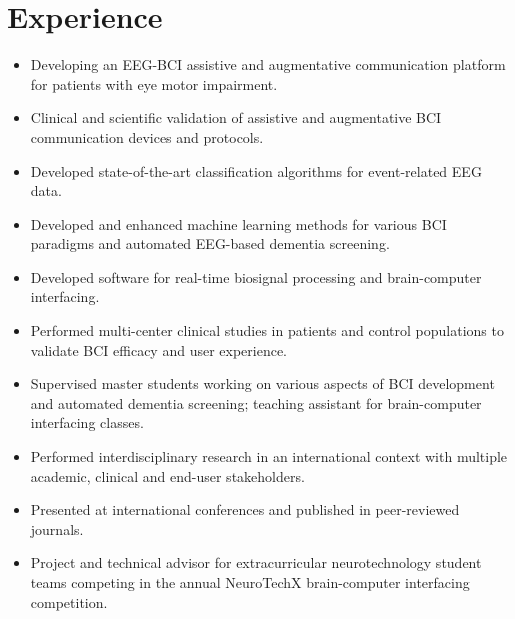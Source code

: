 \documentclass{resume}
\begin{document}
\section{Experience}
\begin{itemize}
	\item Developing an EEG-BCI assistive and augmentative
	communication platform for patients with eye motor impairment.
	\item Clinical and scientific validation of assistive and
	augmentative BCI communication devices and protocols.
\end{itemize}
\begin{itemize}
 \item Developed state-of-the-art classification algorithms for event-related
 EEG data.
 \item Developed and enhanced machine learning methods for various BCI
 paradigms and automated EEG-based dementia screening.
 \item Developed software for real-time biosignal processing and
 brain-computer interfacing.
 \item Performed multi-center clinical studies in patients and control
 populations to validate BCI efficacy and user experience.
 \item Supervised master students working on various aspects of BCI development
 and automated dementia screening; teaching assistant for brain-computer
 interfacing classes.
 \item Performed interdisciplinary research in an international context with
 multiple academic, clinical and end-user stakeholders.
 \item Presented at international conferences and published in peer-reviewed
   journals.
\end{itemize}
\begin{itemize}
	\item Project and technical advisor for extracurricular neurotechnology
	student teams competing in the annual NeuroTechX brain-computer
	interfacing competition.
\end{itemize}
\smallskip

\end{document}

